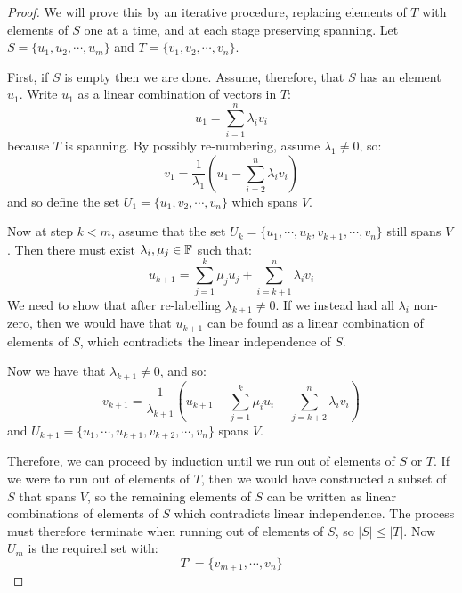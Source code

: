 \documentclass[../Main.tex]{subfiles}
\begin{document}
\begin{proof}
    We will prove this by an iterative procedure, replacing elements of $T$ with elements of $S$ one at a time, and at each stage preserving spanning.
    Let $S = \{u_1, u_2, \cdots, u_m\}$ and $T = \{v_1, v_2, \cdots, v_n\}$.

    First, if $S$ is empty then we are done. Assume, therefore, that $S$ has an element $u_1$.
    Write $u_1$ as a linear combination of vectors in $T$:
    \begin{equation*}
        u_1 = \sum_{i=1}^{n} \lambda_i v_i
    \end{equation*}
    because $T$ is spanning. By possibly re-numbering, assume $\lambda_1 \neq 0$, so:
    \begin{equation*}
        v_1 = \frac{1}{\lambda_1}\left(u_1 - \sum_{i=2}^{n}\lambda_i v_i\right)
    \end{equation*}
    and so define the set $U_1 = \{u_1, v_2, \cdots, v_n\}$ which spans $V$.

    Now at step $k < m$, assume that the set $U_k = \{u_1, \cdots, u_k, v_{k+1}, \cdots, v_n\}$ still spans $V$. Then there must exist $\lambda_i, \mu_j \in \mathbb{F}$ such that:
    \begin{equation*}
        u_{k+1} = \sum_{j=1}^{k} \mu_j u_j + \sum_{i=k+1}^{n} \lambda_i v_i
    \end{equation*}
    We need to show that after re-labelling $\lambda_{k+1} \neq 0$. If we instead had all $\lambda_i$ non-zero, then we would have that $u_{k+1}$ can be found as a linear combination of elements of $S$, which contradicts the linear independence of $S$.

    Now we have that $\lambda_{k+1} \neq 0$, and so:
    \begin{equation*}
        v_{k+1} = \frac{1}{\lambda_{k+1}} \left(u_{k+1} - \sum_{j=1}^{k}\mu_i u_i - \sum_{j=k+2}^{n}\lambda_i v_i\right)
    \end{equation*}
    and $U_{k+1} = \{u_1, \cdots, u_{k+1}, v_{k+2}, \cdots, v_n\}$ spans $V$.

    Therefore, we can proceed by induction until we run out of elements of $S$ or $T$. If we were to run out of elements of $T$, then we would have constructed a subset of $S$ that spans $V$, so the remaining elements of $S$ can be written as linear combinations of elements of $S$ which contradicts linear independence. The process must therefore terminate when running out of elements of $S$, so $|S| \leq |T|$. Now $U_m$ is the required set with:
    \begin{equation*}
        T' = \{v_{m+1}, \cdots, v_n\}
    \end{equation*}
\end{proof}
\end{document}
